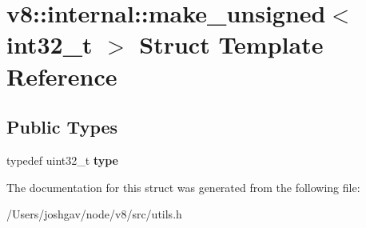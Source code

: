 \hypertarget{structv8_1_1internal_1_1make__unsigned_3_01int32__t_01_4}{}\section{v8\+:\+:internal\+:\+:make\+\_\+unsigned$<$ int32\+\_\+t $>$ Struct Template Reference}
\label{structv8_1_1internal_1_1make__unsigned_3_01int32__t_01_4}
\subsection*{Public Types}
\begin{DoxyCompactItemize}
\item 
typedef uint32\+\_\+t {\bfseries type}\hypertarget{structv8_1_1internal_1_1make__unsigned_3_01int32__t_01_4_a07775c8f5794dd0b41478c2974e01d25}{}\label{structv8_1_1internal_1_1make__unsigned_3_01int32__t_01_4_a07775c8f5794dd0b41478c2974e01d25}

\end{DoxyCompactItemize}


The documentation for this struct was generated from the following file\+:\begin{DoxyCompactItemize}
\item 
/\+Users/joshgav/node/v8/src/utils.\+h\end{DoxyCompactItemize}
